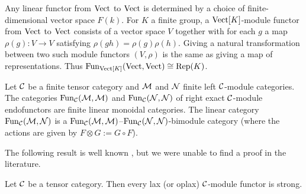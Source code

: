 \documentclass{amsart}
\begin{document}
 


\begin{example}
Any linear functor from $\mathrm{Vect}$ to $\mathrm{Vect}$ is determined by a choice of finite-dimensional vector space $F(k)$.  For $K$ a finite group, a $\mathrm{Vect}[K]$-module functor from $\mathrm{Vect}$ to $\mathrm{Vect}$ consists of a vector space $V$ together with for each $g$ a map $\rho(g): V \rightarrow V$ satisfying $\rho(gh) = \rho(g)\rho(h)$.  Giving a natural transformation between two such module functors $(V, \rho)$ is the same as giving a map of representations.  Thus $\operatorname{Fun}_{\mathrm{Vect}[K]}(\mathrm{Vect}, \mathrm{Vect}) \cong \mathrm{Rep}(K)$.
\end{example}

\begin{example}
	Let $\mathcal C$ be a finite tensor category and $\mathcal M$ and $\mathcal N$ finite left $\mathcal C$-module categories. The categories $\operatorname{Fun}_{\mathcal C}(\mathcal M, \mathcal M)$ and $\operatorname{Fun}_{\mathcal C}(\mathcal N, \mathcal N)$ of right exact $\mathcal C$-module endofunctors are finite linear monoidal categories. 
	The linear category $\operatorname{Fun}_{\mathcal C}(\mathcal M, \mathcal N)$ is a $\operatorname{Fun}_{\mathcal C}(\mathcal M, \mathcal M)$--$\operatorname{Fun}_{\mathcal C}(\mathcal N, \mathcal N)$-bimodule category (where the actions are given by $F \otimes G := G \circ F$). 
\end{example}


The following result is well known \cite[Rmk 4]{MR1976459}, but we were unable to find a proof in the literature.

\begin{lemma} \label{lem:laxisstrong}
	Let $\mathcal C$ be a tensor category. Then every lax (or oplax) $\mathcal C$-module functor is strong.  
\end{lemma} 
\end{document}

